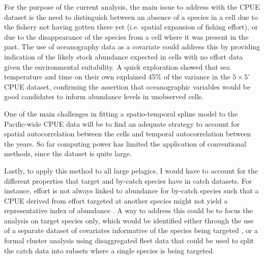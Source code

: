 \documentclass{article}
\newcommand{\griddef}[2]{$#1 \times #2^\circ$}
\begin{document}
For the purpose of the current analysis, the main issue to address
with the CPUE dataset is the need to distinguish between an absence of
a species in a cell due to the fishery not having gotten there yet
(i.e. spatial expansion of fishing effort), or
due to the disappearance of the species from a cell where it was
present in the past. The use of oceanography data as a covariate could
address this by providing indication of the likely stock abundance
expected in cells with no effort data given the environmental
suitability. A quick exploration showed that sea temperature and time on
their own explained 45\% of the variance in the \griddef{5}{5} CPUE dataset,
confirming the assertion that oceanographic variables would be good
candidates to inform abundance levels in unobserved cells.

One of the main challenges in fitting a spatio-temporal spline model
to the Pacific-wide CPUE data will be to find an adequate strategy to
account for spatial autocorrelation between the cells and
temporal autocorrelation between the years. So far computing power has
limited the application of conventional methods, since the dataset is
quite large.


Lastly, to apply this method to all large pelagics, I would have
to account for the different properties that target
and by-catch species have in catch datasets. For instance, effort is
not always linked to abundance for by-catch species such that a CPUE
derived from effort targeted at another species might not yield a
representative index of abundance \citep[see][]{Ortiz2004_a}. A way to address this could be to focus the
analysis on target species only, which would be identified either
through the use of a separate dataset of covariates informative of the
species being targeted \citep[e.g. historical expert opinion,
hooks-per-basket, see][]{Ward2005_a}, or a formal cluster analysis
using disaggregated fleet data that could be used to split the catch
data into subsets where a single species is being targeted.

\end{document}
